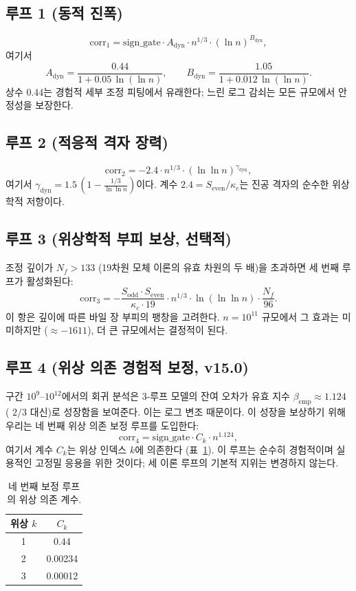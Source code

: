 \documentclass[11pt,a4paper]{article}
\newcommand{\kappac}{\kappa_c}
\newcommand{\Sodd}{S_{\mathrm{odd}}}
\newcommand{\Seven}{S_{\mathrm{even}}}
\begin{document}
	\subsection{루프 1 (동적 진폭)}
	\[
	\mathrm{corr}_1 = \mathrm{sign\_gate} \cdot A_{\mathrm{dyn}} \cdot n^{1/3} \cdot (\ln n)^{B_{\mathrm{dyn}}},
	\]
	여기서
	\[
	A_{\mathrm{dyn}} = \frac{0.44}{1 + 0.05\,\ln(\ln n)}, \qquad
	B_{\mathrm{dyn}} = \frac{1.05}{1 + 0.012\,\ln(\ln n)}.
	\]
	상수 \(0.44\)는 경험적 세부 조정 피팅에서 유래한다; 느린 로그 감쇠는 모든 규모에서 안정성을 보장한다.
	
	\subsection{루프 2 (적응적 격자 장력)}
	\[
	\mathrm{corr}_2 = -2.4 \cdot n^{1/3} \cdot (\ln\ln n)^{\gamma_{\mathrm{dyn}}},
	\]
	여기서 \(\gamma_{\mathrm{dyn}} = 1.5\,(1 - \frac{1/3}{\ln\ln n})\)이다. 계수 \(2.4 = \Seven/\kappac\)는 진공 격자의 순수한 위상학적 저항이다.
	
	\subsection{루프 3 (위상학적 부피 보상, 선택적)}
	조정 깊이가 \(N_f > 133\) (19차원 모체 이론의 유효 차원의 두 배)을 초과하면 세 번째 루프가 활성화된다:
	\[
	\mathrm{corr}_3 = -\frac{\Sodd\cdot\Seven}{\kappac\cdot 19} \cdot n^{1/3} \cdot \ln(\ln\ln n) \cdot \frac{N_f}{96}.
	\]
	이 항은 깊이에 따른 바일 장 부피의 팽창을 고려한다. \(n=10^{11}\) 규모에서 그 효과는 미미하지만 (\(\approx -1611\)), 더 큰 규모에서는 결정적이 된다.
	
	\subsection{루프 4 (위상 의존 경험적 보정, v15.0)}
	구간 \(10^9\)--\(10^{12}\)에서의 회귀 분석은 3-루프 모델의 잔여 오차가 유효 지수 \(\beta_{\mathrm{emp}} \approx 1.124\) ( \(2/3\) 대신)로 성장함을 보여준다. 이는 로그 변조 때문이다. 이 성장을 보상하기 위해 우리는 네 번째 위상 의존 보정 루프를 도입한다:
	\[
	\mathrm{corr}_4 = \mathrm{sign\_gate} \cdot C_k \cdot n^{1.124},
	\]
	여기서 계수 \(C_k\)는 위상 인덱스 \(k\)에 의존한다 (표~\ref{tab:phase-coeffs}). 이 루프는 순수히 경험적이며 실용적인 고정밀 응용을 위한 것이다; 세 이론 루프의 기본적 지위는 변경하지 않는다.
	
	\begin{table}[htbp]
		\centering
		\caption{네 번째 보정 루프의 위상 의존 계수.}
		\label{tab:phase-coeffs}
		\begin{tabular}{c c}
			\toprule
			위상 \(k\) & \(C_k\) \\
			\midrule
			1 & 0.44 \\
			2 & 0.00234 \\
			3 & 0.00012 \\
			\bottomrule
		\end{tabular}
	\end{table}
	
\end{document}
